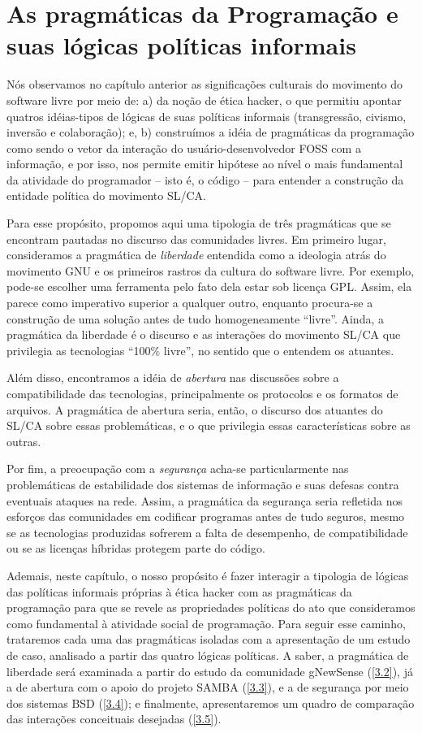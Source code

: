 \chapter{As pragm\'aticas da Programaç\~ao e suas l\'ogicas pol\'iticas informais} \label{3}

Nós observamos no capítulo anterior as significações culturais do movimento do software livre por meio de: a) da noção de ética hacker, o que permitiu apontar quatros idéias-tipos de lógicas de suas políticas informais (transgressão, civismo, inversão e colaboração); e, b) construímos a idéia de pragmáticas da programação como sendo o vetor da interação do usuário-desenvolvedor FOSS com a informação, e por isso, nos permite emitir hipótese ao nível o mais fundamental da atividade do programador – isto é, o código – para entender a construção da entidade política do movimento SL/CA.

Para esse propósito, propomos aqui uma tipologia de três pragmáticas que se encontram pautadas no discurso das comunidades livres. Em primeiro lugar, consideramos a pragmática de \emph{liberdade} entendida como a ideologia atrás do movimento GNU e os primeiros rastros da cultura do software livre. Por exemplo, pode-se escolher uma ferramenta pelo fato dela estar sob licença GPL. Assim, ela parece como imperativo superior a qualquer outro, enquanto procura-se a construção de uma solução antes de tudo homogeneamente “livre”. Ainda, a pragmática da liberdade é o discurso e as interações do movimento SL/CA que privilegia as tecnologias “100\% livre”, no sentido que o entendem os atuantes.

Além disso, encontramos a idéia de \emph{abertura} nas discussões sobre a compatibilidade das tecnologias, principalmente os protocolos e os formatos de arquivos. A pragmática de abertura seria, então, o discurso dos atuantes do SL/CA sobre essas problemáticas, e o que privilegia essas características sobre as outras.

Por fim, a preocupação com a \emph{segurança} acha-se particularmente nas problemáticas de estabilidade dos sistemas de informação e suas defesas contra eventuais ataques na rede. Assim, a pragmática da segurança seria refletida  nos esforços das comunidades em codificar programas antes de tudo seguros, mesmo se as tecnologias produzidas sofrerem a falta de desempenho, de compatibilidade ou se as licenças híbridas protegem parte do código.

Ademais, neste capítulo, o nosso propósito é fazer interagir a tipologia de lógicas das políticas informais próprias à ética hacker com as pragmáticas da programação para que se revele as propriedades políticas do ato que consideramos como fundamental à atividade social de programação. Para seguir esse caminho, trataremos cada uma das pragmáticas isoladas com a apresentação de um estudo de caso, analisado a partir das quatro lógicas políticas. A saber, a pragmática de liberdade será examinada a partir do estudo da comunidade gNewSense (\ref{3.2}), já a de abertura com o apoio do projeto SAMBA (\ref{3.3}), e a de segurança por meio dos sistemas BSD (\ref{3.4}); e finalmente, apresentaremos um quadro de comparação das interações conceituais desejadas (\ref{3.5}).

